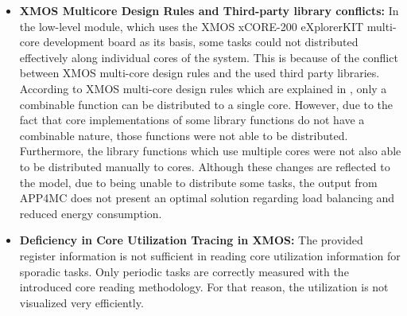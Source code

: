 \begin{itemize}
	\item \textbf{XMOS Multicore Design Rules and Third-party library conflicts:} In the low-level module, which uses the XMOS xCORE-200 eXplorerKIT multi-core development board as its basis, some tasks could not distributed effectively along individual cores of the system. This is because of the conflict between XMOS multi-core design rules and the used third party libraries. According to XMOS multi-core design rules which are explained in \cite{xmosprogrguide}, only a combinable function can be distributed to a single core. However, due to the fact that core implementations of some library functions do not have a combinable nature, those functions were not able to be distributed. Furthermore, the library functions which use multiple cores were not also able to be distributed manually to cores. Although these changes are reflected to the model, due to being unable to distribute some tasks, the output from APP4MC does not present an optimal solution regarding load balancing and reduced energy consumption.
	\item \textbf{Deficiency in Core Utilization Tracing in XMOS:} The provided register information is not sufficient in reading core utilization information for sporadic tasks. Only periodic tasks are correctly measured with the introduced core reading methodology. For that reason, the utilization is not visualized very efficiently.
\end{itemize}
